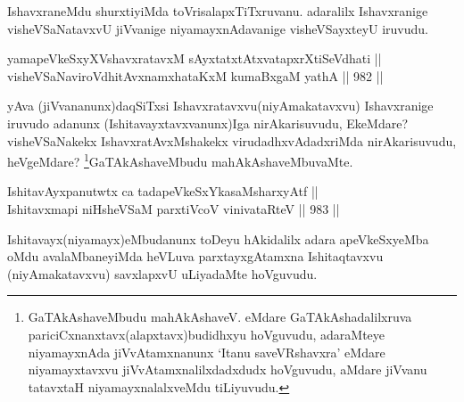 \begin{artha}
IshavxraneMdu shurxtiyiMda toVrisalapxTiTxruvanu. adaralilx Ishavxranige visheVSaNatavxvU jiVvanige niyamayxnAdavanige visheVSayxteyU iruvudu.
\end{artha}


\begin{shl}
yamapeVkeSxyXVshavxratavxM sAyxtatxtAtxvatapxrXtiSeVdhati || \\
visheVSaNaviroVdhitAvxnamxhataKxM kumaBxgaM yathA \hfill || 982 ||  
\end{shl}

\begin{artha}
yAva (jiVvananunx)daqSiTxsi Ishavxratavxvu(niyAmakatavxvu) Ishavxranige iruvudo adanunx (Ishitavayxtavxvanunx)Iga nirAkarisuvudu, EkeMdare? visheVSaNakekx IshavxratAvxMshakekx virudadhxvAdadxriMda nirAkarisuvudu, heVgeMdare? \footnote{GaTAkAshaveMbudu mahAkAshaveV. eMdare GaTAkAshadalilxruva pariciCxnanxtavx(alapxtavx)budidhxyu hoVguvudu, adaraMteye niyamayxnAda jiVvAtamxnanunx `Itanu saveVRshavxra' eMdare niyamayxtavxvu jiVvAtamxnalilxdadxdudx hoVguvudu, aMdare jiVvanu tatavxtaH niyamayxnalalxveMdu tiLiyuvudu.}GaTAkAshaveMbudu mahAkAshaveMbuvaMte.
\end{artha}

\begin{shl}
\footnotemark[2]IshitavAyxpanutwtx ca tadapeVkeSxYkasaMsharxyAtf || \\
Ishitavxmapi niHsheVSaM parxtiVcoV vinivataRteV \hfill || 983 ||  
\end{shl}

\begin{artha}
Ishitavayx(niyamayx)eMbudanunx toDeyu hAkidalilx adara apeVkeSxyeMba oMdu avalaMbaneyiMda heVLuva parxtayxgAtamxna Ishitaqtavxvu (niyAmakatavxvu) savxlapxvU uLiyadaMte hoVguvudu.
\end{artha}

